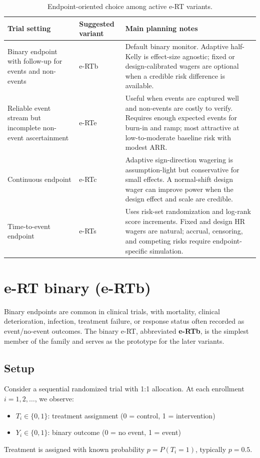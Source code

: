 \documentclass[10pt]{article}
\begin{document}
\begin{table}[htbp]
\centering
\small
\caption{Endpoint-oriented choice among active e-RT variants.}
\label{tab:variant_selection}
\begin{tabular}{p{}p{}p{}}
\toprule
Trial setting & Suggested variant & Main planning notes \\
\midrule
Binary endpoint with follow-up for events and non-events & e-RTb & Default binary monitor. Adaptive half-Kelly is effect-size agnostic; fixed or design-calibrated wagers are optional when a credible risk difference is available. \\
Reliable event stream but incomplete non-event ascertainment & e-RTe & Useful when events are captured well and non-events are costly to verify. Requires enough expected events for burn-in and ramp; most attractive at low-to-moderate baseline risk with modest ARR. \\
Continuous endpoint & e-RTc & Adaptive sign-direction wagering is assumption-light but conservative for small effects. A normal-shift design wager can improve power when the design effect and scale are credible. \\
Time-to-event endpoint & e-RTs & Uses risk-set randomization and log-rank score increments. Fixed and design HR wagers are natural; accrual, censoring, and competing risks require endpoint-specific simulation. \\
\bottomrule
\end{tabular}
\end{table}

\section{e-RT binary (e-RTb)}

Binary endpoints are common in clinical trials, with mortality, clinical deterioration, infection, treatment failure, or response status often recorded as event/no-event outcomes. The binary e-RT, abbreviated \textbf{e-RTb}, is the simplest member of the family and serves as the prototype for the later variants.

\subsection{Setup}

Consider a sequential randomized trial with 1:1 allocation. At each enrollment $i = 1, 2, \ldots$, we observe:
\begin{itemize}
    \item $T_i \in \{0, 1\}$: treatment assignment (0 = control, 1 = intervention)
    \item $Y_i \in \{0, 1\}$: binary outcome (0 = no event, 1 = event)
\end{itemize}
Treatment is assigned with known probability $p = P(T_i = 1)$, typically $p = 0.5$.
\end{document}
